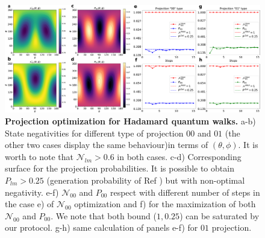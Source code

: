 \documentclass[
	aps, pra,
	superscriptaddress, twocolumn,
	floatfix,
	10pt
]{revtex4-1}
\begin{document}
\begin{figure}[t]
    \centering
    \includegraphics[width=\textwidth]{proj.pdf}
    \caption{\textbf{Projection optimization for Hadamard quantum walks.} a-b) State negativities for different type of projection $00$ and $01$ (the other two cases display the same behaviour)in terms of $(\theta, \phi)$. It is worth to note that $\mathcal{N}_{lm}>0.6$ in both cases. c-d) Corresponding surface for the projection probabilities. It is possible to obtain $P_{lm}> 0.25$ (generation probability of Ref \cite{fickler2012quantum}) but with non-optimal negativity. e-f) $\mathcal{N}_{00}$ and $P_{00}$ respect with different number of steps in the case e) of $\mathcal{N}_{00}$ optimization and f) for the maximization of both $\mathcal{N}_{00}$ and $P_{00}$. We note that both bound ($1, 0.25$) can be saturated by our protocol. g-h) same calculation of panels e-f) for $01$ projection.}
    \label{fig:10steps_results}
\end{figure}
\end{document}
